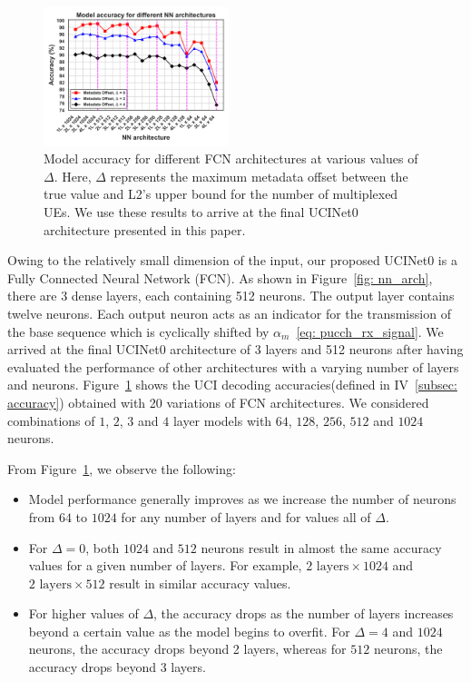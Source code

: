 \documentclass[journal]{IEEEtran}
\begin{document}
\begin{figure}[h!]
    \centering
    \includegraphics[width=0.48\textwidth]{Figures/Hw_complexity_analysis_all_arch_epochs_150.png}
    \caption{Model accuracy for different FCN architectures at various values of $\Delta$. Here, $\Delta$ represents the maximum metadata offset between the true value and L2’s upper bound for the number of multiplexed UEs. We use these results to arrive at the final UCINet0 architecture presented in this paper.}
    \label{fig: acc_vs_complexity}
\end{figure}
Owing to the relatively small dimension of the input, our proposed UCINet0 is a Fully Connected Neural Network (FCN). As shown in Figure~\ref{fig: nn_arch}, there are 3 dense layers, each containing 512 neurons. 
The output layer contains twelve neurons. Each output neuron acts as an indicator for the transmission of the base sequence which is cyclically shifted by $\alpha_m$~\ref{eq: pucch_rx_signal}. We arrived at the final UCINet0 architecture of 3 layers and 512 neurons after having evaluated the performance of other architectures with a varying number of layers and neurons. Figure~\ref{fig: acc_vs_complexity} shows the UCI decoding accuracies(defined in IV~\ref{subsec: accuracy}) obtained with 20 variations of FCN architectures. We considered combinations of $1$, $2$, $3$ and $4$ layer models with $64$, $128$, $256$, $512$ and $1024$ neurons. 

From Figure~\ref{fig: acc_vs_complexity}, we observe the following: 

\begin{itemize}
    \item Model performance generally improves as we increase the number of neurons from $64$ to $1024$ for any number of layers and for values all of $\Delta$.
    \item For $\Delta=0$, both $1024$ and $512$ neurons result in almost the same accuracy values for a given number of layers. For example, $2 \text{ layers} \times 1024$ and $2 \text{ layers} \times 512$ result in similar accuracy values.
    \item For higher values of $\Delta$, the accuracy drops as the number of layers increases beyond a certain value as the model begins to overfit. For $\Delta=4$ and $1024$ neurons, the accuracy drops beyond 2 layers, whereas for $512$ neurons, the accuracy drops beyond 3 layers.
\end{itemize} 
\end{document}
